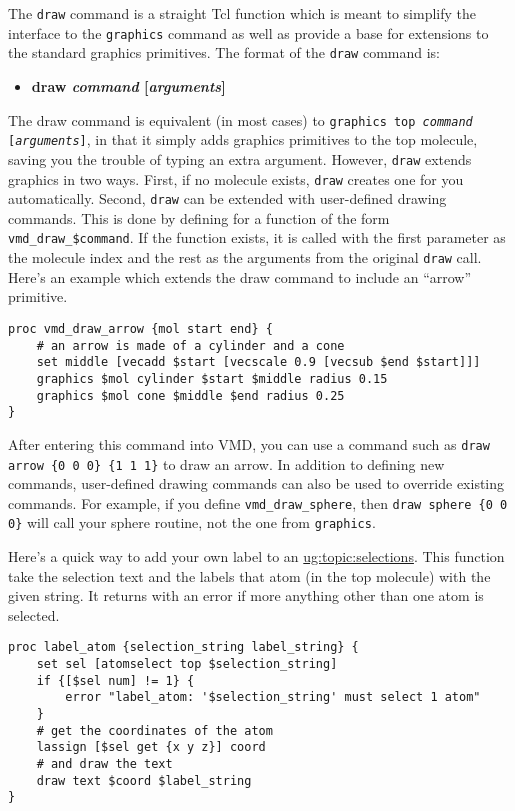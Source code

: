 The {\tt draw} command is a straight Tcl function which is meant to
simplify the interface to the {\tt graphics} command as well as
provide a base for extensions to the standard graphics primitives.
The format of the {\tt draw} command is:
\begin{itemize}
\item {\bf draw {\it command} [{\it arguments}]}
\end{itemize}

\noindent The draw command is equivalent (in most cases) to {\tt graphics top
{\it command} [{\it arguments}]}, in that it simply adds graphics
primitives to the top molecule, saving you the trouble of typing
an extra argument.  However, {\tt draw} extends {graphics} in two ways.
First, if no molecule exists, {\tt draw} creates one for you automatically.
Second, {\tt draw} can be extended with user-defined drawing commands.
This is done by defining for a function of the form
{\tt vmd\_draw\_\$command}.  If the function exists, it is called with the
first parameter as the molecule index and the rest as the arguments from
the original {\tt draw} call.
Here's an example which extends the draw command to include an
``arrow'' primitive.

\begin{verbatim}
proc vmd_draw_arrow {mol start end} {
    # an arrow is made of a cylinder and a cone
    set middle [vecadd $start [vecscale 0.9 [vecsub $end $start]]]
    graphics $mol cylinder $start $middle radius 0.15
    graphics $mol cone $middle $end radius 0.25
}
\end{verbatim}

\noindent After entering this command into VMD, you can use a command such as
\verb!draw arrow {0 0 0} {1 1 1}! 
to draw an arrow.
In addition to defining new commands, user-defined drawing commands can also 
be used to override existing commands.  For example, if you define
{\tt vmd\_draw\_sphere}, then \verb!draw sphere {0 0 0}!
will call your sphere routine, not the one from {\tt graphics}.


  Here's a quick way to add your own label to an 
\hyperref{atom selection}{atom selection [\S }{]}{ug:topic:selections}.  
This function take the selection text and the labels that
atom (in the {\sf top} molecule) with the given string.  It returns
with an error if more anything other than one atom is selected.
\begin{verbatim}
proc label_atom {selection_string label_string} {
    set sel [atomselect top $selection_string]
    if {[$sel num] != 1} {
        error "label_atom: '$selection_string' must select 1 atom"
    }
    # get the coordinates of the atom
    lassign [$sel get {x y z}] coord
    # and draw the text
    draw text $coord $label_string
}
\end{verbatim}


